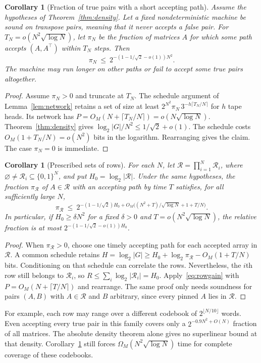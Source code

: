 \documentclass[11pt]{article}
\newtheorem{corollary}[theorem]{Corollary}
\begin{document}
\begin{corollary}[Fraction of true pairs with a short accepting path]
\label{cor:coverage}
Assume the hypotheses of Theorem~\ref{thm:density}. Let a fixed
nondeterministic machine be sound on transpose pairs, meaning that
it never accepts a false pair. For $T_N=o(N^2\sqrt{\log N})$, let
$\pi_N$ be the fraction of matrices $A$ for which some path accepts
$(A,A^\top)$ within $T_N$ steps. Then
\[
                 \pi_N\ \le\ 2^{-(1-1/\sqrt2-o(1))N^2}.
\]
The machine may run longer on other paths or fail to accept some
true pairs altogether.
\end{corollary}
\begin{proof}
Assume $\pi_N>0$ and truncate at $T_N$. The schedule argument of
Lemma~\ref{lem:network} retains a set of size at least
$2^{N^2}\pi_N\,3^{-h\lceil T_N/N\rceil}$ for $h$ tape heads.
Its network has $P=O_M(N+\lceil T_N/N\rceil)=o(N\sqrt{\log N})$.
Theorem~\ref{thm:density} gives $\log_2|G|/N^2\le1/\sqrt2+o(1)$.
The schedule costs $O_M(1+T_N/N)=o(N^2)$ bits in the logarithm.
Rearranging gives the claim. The case $\pi_N=0$ is immediate.
\end{proof}

\begin{corollary}[Prescribed sets of rows]\label{cor:product}
For each $N$, let $\mathcal R=\prod_{i=1}^N\mathcal R_i$, where
$\varnothing\ne\mathcal R_i\subseteq\{0,1\}^N$, and put
$H_0=\log_2|\mathcal R|$. Under the same hypotheses, the fraction
$\pi_{\mathcal R}$ of $A\in\mathcal R$ with an accepting path by time
$T$ satisfies, for all sufficiently large $N$,
\[
 \pi_{\mathcal R}\ \le\
 2^{-(1-1/\sqrt2)H_0+
        O_M\bigl((N^2+T)/\sqrt{\log N}+1+T/N\bigr)}.
\]
In particular, if $H_0\ge\delta N^2$ for a fixed $\delta>0$ and
$T=o(N^2\sqrt{\log N})$, the relative fraction is at most
$2^{-(1-1/\sqrt2-o(1))H_0}$.
\end{corollary}
\begin{proof}
When $\pi_{\mathcal R}>0$, choose one timely accepting path for each
accepted array in $\mathcal R$. A common schedule retains
$H=\log_2|G|\ge H_0+\log_2\pi_{\mathcal R}-O_M(1+T/N)$ bits.
Conditioning on that schedule can correlate the rows. Nevertheless,
the $i$th row still belongs to $\mathcal R_i$, so
$R\le\sum_i\log_2|\mathcal R_i|=H_0$. Apply~\eqref{eq:rowgain} with
$P=O_M(N+\lceil T/N\rceil)$ and rearrange. The same proof only needs
soundness for pairs $(A,B)$ with $A\in\mathcal R$ and $B$ arbitrary,
since every pinned $A$ lies in $\mathcal R$.
\end{proof}
For example, each row may range over a different codebook of
$2^{\lfloor N/10\rfloor}$ words. Even accepting every true pair in
this family covers only a $2^{-0.9N^2+O(N)}$ fraction of all matrices.
The absolute density theorem alone gives no superlinear bound at that
density. Corollary~\ref{cor:product} still forces
$\Omega_M(N^2\sqrt{\log N})$ time for complete coverage of these
codebooks.
\end{document}
